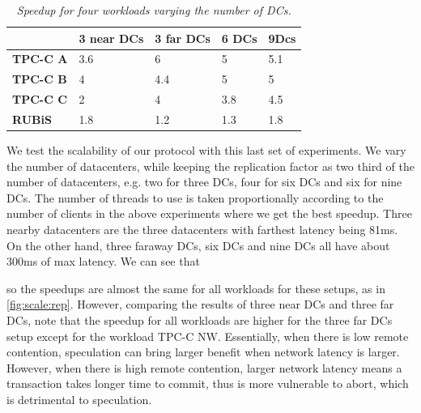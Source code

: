\begin{table}
\small
\begin{center}
  \begin{tabular}{ l | l | l | l | l } 
    &  \scriptsize \textbf{3 near DCs} & \scriptsize \textbf{3 far DCs}& \scriptsize \textbf{6 DCs} & \scriptsize \textbf{9Dcs} \\ \hline
  \scriptsize \textbf{TPC-C A} & \scriptsize 3.6 &  \scriptsize  6 & \scriptsize  5 &  \scriptsize 5.1 \\ \hline
    \scriptsize \textbf{TPC-C B}  &  \scriptsize 4 & \scriptsize 4.4  & \scriptsize 5 & \scriptsize 5 \\ \hline
    \scriptsize  \textbf{TPC-C C}  &  \scriptsize 2 & \scriptsize 4  & \scriptsize 3.8 & \scriptsize 4.5 \\ \hline
   \scriptsize \textbf{RUBiS}  & \scriptsize 1.8 & \scriptsize 1.2 & \scriptsize 1.3 & \scriptsize 1.8 \\ \hline
  \end{tabular}
\end{center}
\caption{\textit{Speedup for four workloads varying the number of DCs.}}
\label{tab:speedup}
\end{table}

We test the scalability of our protocol with this last set of experiments. We vary the number of datacenters, while keeping the replication factor as two third of the number of datacenters, e.g. two for three DCs, four for six DCs and six for nine DCs. The number of threads to use is taken proportionally according to the number of clients in the above experiments where we get the best speedup. Three nearby datacenters are the three datacenters with farthest latency being 81ms. On the other hand, three faraway DCs, six DCs and nine DCs all have about 300ms of max latency. We can see that 

 so the speedups are almost the same for all workloads for these setups, as in \ref{fig:scale:rep}. However, comparing the results of three near DCs and three far DCs, note that the speedup for all workloads are higher for the three far DCs setup except for the workload TPC-C NW. Essentially, when there is low remote contention, speculation can bring larger benefit when network latency is larger. However, when there is high remote contention, larger network latency means a transaction takes longer time to commit, thus is more vulnerable to abort, which is detrimental to speculation.
 \fi
